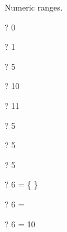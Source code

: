 \documentclass{article}
\begin{document}
Numeric ranges.
\begin{zed} \vdash?  0    \end{zed}
\begin{zed} \vdash?  1    \end{zed}
\begin{zed} \vdash?  5    \end{zed}
\begin{zed} \vdash?  10   \end{zed}
\begin{zed} \vdash?  11   \end{zed}
\begin{zed} \vdash?  5    \end{zed}
\begin{zed} \vdash?  5    \end{zed}
\begin{zed} \vdash?  5    \end{zed}
\begin{zed} \vdash?  6  = \{ \} \end{zed}
\begin{zed} \vdash?  6  = \emptyset \end{zed}
\begin{zed} \vdash?  6  = 10  \end{zed}
\end{document}
